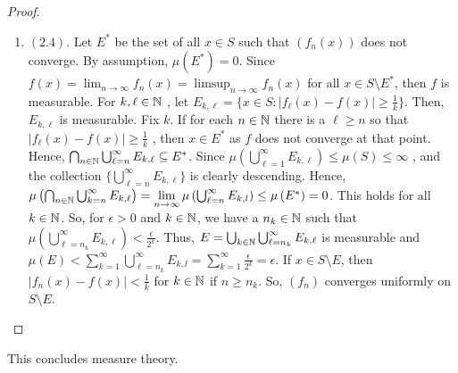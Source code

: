 \begin{proof}
\begin{enumerate}
		\item \(\left( 2.4 \right) \). Let \(E^{*}\) be the set of all \(x \in S\)  such that \(\left( f_{n}\left( x \right)  \right) \) does not converge. By assumption, \( \mu\left( E^{*} \right)  = 0\). Since \(f\left( x \right) = \lim_{n \to \infty}f_{n}\left( x \right) = \limsup_{n \to \infty} f_{n}\left( x \right) \) for all \(x \in S \setminus E^{*}\), then \(f\) is measurable. For \(k, \ell \in \mathbb{N}\) , let \(E_{k, \ell} = \{x \in S : \left| f_{\ell}\left( x \right) - f\left( x \right)  \right| \ge \frac{1}{k}\} \). Then, \(E_{k, \ell}\) is measurable. Fix \(k\). If for each \( n \in \mathbb{N}\) there is a \(\ell \ge n\) so that \(\left| f_{\ell}\left( x \right)  - f\left( x \right)  \right|\ge \frac{1}{k} \) , then \(x \in E^{*}\) as \(f\) does not converge at that point. Hence, \(\bigcap_{n \in \mathbb{N}} \bigcup_{\ell = n} ^{\infty}E_{k, \ell} \subseteq E^{*}\). Since \( \mu\left( \bigcup_{\ell=1} ^{\infty}E_{k, \ell} \right) \le \mu\left( S \right)  \le \infty \) , and the collection \(\{\bigcup_{\ell = n} ^{\infty}E_{k, \ell}\} \) is clearly descending. Hence, \( \mu \left( \bigcap_{n \in \N} \bigcup_{k=n} ^{\infty}E_{k, \ell} \right) = \lim_{n \to \infty} \mu \left( \bigcup_{\ell=n} ^{\infty}E_{k, l} \right) \le \mu\left( E^{*} \right) = 0 \). This holds for all \(k \in \mathbb{N}\). So, for \(\epsilon > 0\) and \(k \in \mathbb{N}\), we have a \(n_{k} \in \mathbb{N}\) such that \( \mu\left( \bigcup_{\ell = n_{k}} ^{\infty} E_{k, \ell} \right) < \frac{\epsilon}{2^{k}}\). Thus, \(E = \bigcup_{k \in \mathbb{N}} \bigcup_{\ell = n_{k}}^{\infty} E_{k, \ell}  \) is measurable and \( \mu\left( E \right)  < \sum_{k=1}^{\infty} \bigcup_{\ell= n_{k}}^{\infty}E_{k, l} = \sum_{k=1}^{\infty} \frac{\epsilon}{2^{k}} = \epsilon \). If \(x \in S \setminus E\), then \(\left| f_{n}\left( x \right) - f\left( x \right)  \right| < \frac{1}{k}\) for \(k \in \mathbb{N}\) if \(n \ge n_{k}\). So, \(\left( f_{n} \right) \) converges uniformly on \(S \setminus E\).

	\end{enumerate}
\end{proof}
This concludes measure theory.
